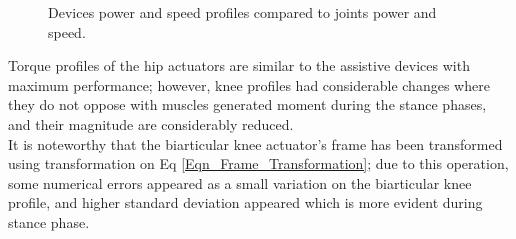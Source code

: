 \documentclass[10pt,letterpaper]{article}
\begin{document}
\begin{figure}[!h]
	\centering
	\hfil
	\hfil	
	\caption{Devices power and speed profiles compared to joints power and speed.}
	\label{Fig_Feasible_Exo_PowerProfiles}
\end{figure}
Torque profiles of the hip actuators are similar to the assistive devices with maximum performance; however, knee profiles had considerable changes where they do not oppose with muscles generated moment during the stance phases, and their magnitude are considerably reduced.\\
It is noteworthy that the biarticular knee actuator's frame has been transformed using transformation on Eq \ref{Eqn_Frame_Transformation}; due to this operation, some numerical errors appeared as a small variation on the biarticular knee profile, and higher standard deviation appeared which is more evident during stance phase.
\end{document}
